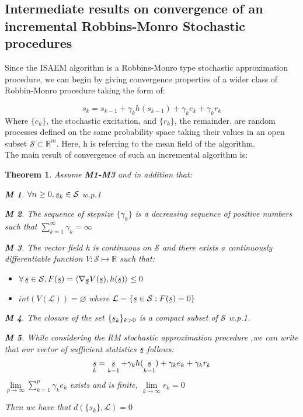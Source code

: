 \documentclass{article}
\theoremstyle{plain}
\newtheorem{assumption}{M}
\DeclareMathOperator*{\s}{\barbelow{s}}
\theoremstyle{plain}
\newtheorem{thm}{Theorem}
\theoremstyle{definition}
\newcommand\barbelow[1]{\stackunder[1.2pt]{$#1$}{\rule{.8ex}{.075ex}}}
\begin{document}
\subsection{Intermediate results on convergence of an incremental Robbins-Monro Stochastic procedures}
Since the ISAEM algorithm is a Robbins-Monro type stochastic approximation procedure, we can begin by giving convergence properties of a wider class of Robbin-Monro procedure taking the form of:

\begin{equation}
s_k = s_{k-1} + \gamma_k h(s_{k-1}) +\gamma_k e_k + \gamma_k r_k
\end{equation}
Where $\{e_k\}$, the stochastic excitation, and $\{r_k\}$, the remainder, are random processes defined on the same probability space taking their values in an open subset $\mathcal{S} \subset \mathbb{R}^m$.
Here, h is referring to the mean field of the algorithm.\\

The main result of convergence of such an incremental algorithm is:
\begin{thm}
Assume \textbf{M1-M3} and in addition that:
\begin{assumption}
$\forall n \geq 0, \s_k \in \mathcal{S}$ w.p.1
\end{assumption}

\begin{assumption}
The sequence of stepsize $\{\gamma_k\}$ is a decreasing sequence of positive numbers such that $\sum_{k=1}^{\infty}{\gamma_k} = \infty$
\end{assumption}

\begin{assumption}
The vector field h is continuous on $\mathcal{S}$ and there exists a continuously differentiable function $V: \mathcal{S} \mapsto \mathbb{R}$ such that:
\begin{itemize}
  \item $\forall \s \in \mathcal{S}, F(\s) = \langle \nabla_{\s}V(\s), h(\s) \rangle \leq 0$
  \item $int(V(\mathcal{L})) = \varnothing $ where $ \mathcal{L} = \{\s \in \mathcal{S}: F(\s) = 0\}$
\end{itemize}
\end{assumption}

\begin{assumption}
The closure of the set $\{\s_k\}_{k>0}$ is a compact subset of $\mathcal{S}$ w.p.1.
\end{assumption}

\begin{assumption}
While considering the RM stochastic approximation procedure ,we can write that our vector of sufficient statistics $\s$ follows:
\begin{equation}
\s_k = \s_{k-1} + \gamma_k h(\s_{k-1}) + \gamma_k e_k + \gamma_k r_k
\end{equation}
$\lim \limits_{p \to \infty} \sum_{k=1}^{p}{\gamma_k e_k}$ exists and is finite, $\lim \limits_{k \to \infty} r_k = 0$
\end{assumption}

Then we have that $d(\{s_k\},\mathcal{L}) = 0$
\end{thm}
\end{document}
